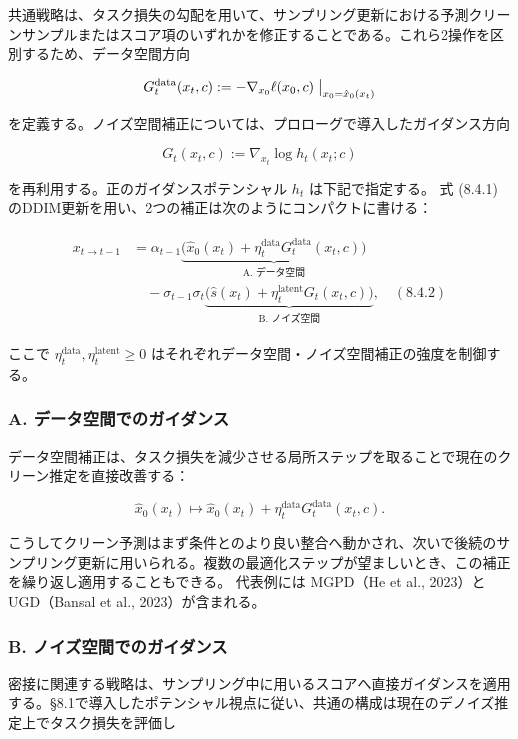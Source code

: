 共通戦略は、タスク損失の勾配を用いて、サンプリング更新における予測クリーンサンプルまたはスコア項のいずれかを修正することである。これら2操作を区別するため、データ空間方向

\[
G_t^{\mathrm{data}}(x_t,c):=-\nabla_{x_0}\ell(x_0,c)\bigm|_{x_0=\hat{x}_0(x_t)}
\]


を定義する。ノイズ空間補正については、プロローグで導入したガイダンス方向

\[
G_t(x_t,c):=\nabla_{x_t}\log h_t(x_t;c)
\]


を再利用する。正のガイダンスポテンシャル $h_t$ は下記で指定する。
式 (8.4.1) のDDIM更新を用い、2つの補正は次のようにコンパクトに書ける：

\begin{align*}
\begin{aligned}
x_{t\to t-1}
&=\alpha_{t-1}\underbrace{\bigl(\hat{x}_0(x_t)+\eta_t^{\mathrm{data}}G_t^{\mathrm{data}}(x_t,c)\bigr)}_{\text{A. データ空間}} \\
&\quad-\sigma_{t-1}\sigma_t\underbrace{\bigl(\hat{s}(x_t)+\eta_t^{\mathrm{latent}}G_t(x_t,c)\bigr)}_{\text{B. ノイズ空間}}, \quad (8.4.2)
\end{aligned}
\end{align*}


ここで $\eta_t^{\mathrm{data}},\eta_t^{\mathrm{latent}}\ge 0$ はそれぞれデータ空間・ノイズ空間補正の強度を制御する。

\subsubsection*{A. データ空間でのガイダンス}


データ空間補正は、タスク損失を減少させる局所ステップを取ることで現在のクリーン推定を直接改善する：

\[
\hat{x}_0(x_t)\longmapsto\hat{x}_0(x_t)+\eta_t^{\mathrm{data}}G_t^{\mathrm{data}}(x_t,c).
\]


こうしてクリーン予測はまず条件とのより良い整合へ動かされ、次いで後続のサンプリング更新に用いられる。複数の最適化ステップが望ましいとき、この補正を繰り返し適用することもできる。
代表例には MGPD（He et al., 2023）と UGD（Bansal et al., 2023）が含まれる。

\subsubsection*{B. ノイズ空間でのガイダンス}


密接に関連する戦略は、サンプリング中に用いるスコアへ直接ガイダンスを適用する。§8.1で導入したポテンシャル視点に従い、共通の構成は現在のデノイズ推定上でタスク損失を評価し

